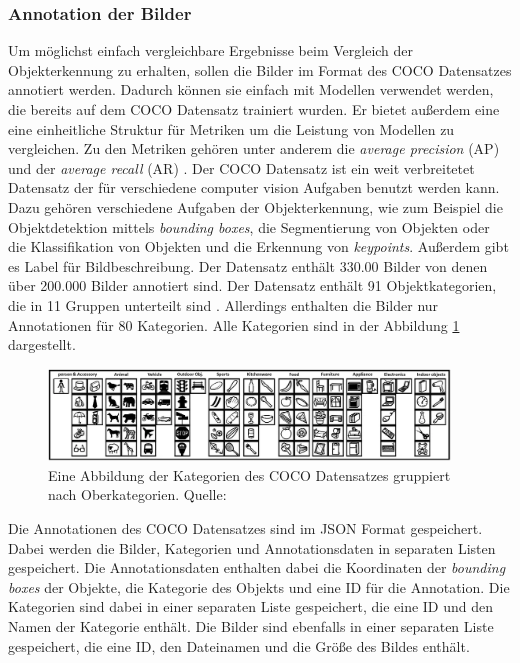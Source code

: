 \subsubsection{Annotation der Bilder}
Um möglichst einfach vergleichbare Ergebnisse beim Vergleich der Objekterkennung zu erhalten, sollen die Bilder im Format des COCO Datensatzes annotiert werden. Dadurch können sie einfach mit Modellen verwendet werden, die bereits auf dem COCO Datensatz trainiert wurden. Er bietet außerdem eine eine einheitliche Struktur für Metriken um die Leistung von Modellen zu vergleichen. Zu den Metriken gehören unter anderem die \emph{average precision} (AP) und der \emph{average recall} (AR) \cite{coco2015eval}.
Der COCO Datensatz ist ein weit verbreitetet Datensatz der für verschiedene computer vision Aufgaben benutzt werden kann. Dazu gehören verschiedene Aufgaben der Objekterkennung, wie zum Beispiel die Objektdetektion mittels \emph{bounding boxes}, die Segmentierung von Objekten oder die Klassifikation von Objekten und die Erkennung von \emph{keypoints}. Außerdem gibt es Label für Bildbeschreibung.
Der Datensatz enthält 330.00 Bilder von denen über 200.000 Bilder annotiert sind. Der Datensatz enthält 91 Objektkategorien, die in 11 Gruppen unterteilt sind \cite{coco2015}. Allerdings enthalten die Bilder nur Annotationen für 80 Kategorien. Alle Kategorien sind in der Abbildung \ref{fig:coco_categories} dargestellt. 
\begin{figure}
    \centering
    \includegraphics[width=0.95\textwidth]{bilder/fig-11-icons-of-91-categories-in-the-ms-coco-dataset-grouped-2cynvw3e.png}
    \caption{Eine Abbildung der Kategorien des COCO Datensatzes gruppiert nach Oberkategorien. Quelle: \cite[S.~13]{lin2015microsoftcococommonobjects}}
    \label{fig:coco_categories}
\end{figure}
Die Annotationen des COCO Datensatzes sind im JSON Format gespeichert. Dabei werden die Bilder, Kategorien und Annotationsdaten in separaten Listen gespeichert. Die Annotationsdaten enthalten dabei die Koordinaten der \emph{bounding boxes} der Objekte, die Kategorie des Objekts und eine ID für die Annotation. Die Kategorien sind dabei in einer separaten Liste gespeichert, die eine ID und den Namen der Kategorie enthält. Die Bilder sind ebenfalls in einer separaten Liste gespeichert, die eine ID, den Dateinamen und die Größe des Bildes enthält.

